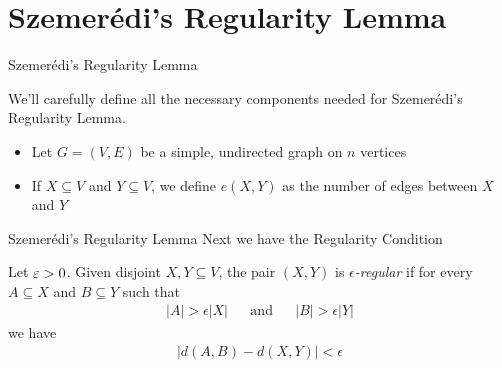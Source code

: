 \section{Szemer\'{e}di's Regularity Lemma}
\begin{frame}{Szemer\'{e}di's Regularity Lemma}
	
We'll carefully define all the necessary components needed for Szemer\'{e}di's Regularity Lemma.
\begin{itemize}
	\item<2-> Let $G = (V,E)$ be a simple, undirected graph on $n$ vertices
	\item<3-> If $X \subseteq V$ and $Y \subseteq V$, we define $e(X,Y)$ as the number of edges between $X$ and $Y$
\end{itemize}
	
\end{frame}

\begin{frame}{Szemer\'{e}di's Regularity Lemma}
Next we have the Regularity Condition
{
\begin{definition}
	Let $\varepsilon > 0$. Given disjoint $X, Y \subseteq V$, the pair $(X,Y)$ is {\em $\epsilon$-regular} if for every $A \subseteq X$ and $B \subseteq Y$ such that
	\begin{align*}
		|A| > \epsilon|X| & & \text{and} & & |B| > \epsilon|Y|
	\end{align*}
	we have
	\begin{align*}
		|d(A,B) - d(X,Y)| < \epsilon
	\end{align*}
\end{definition}}
\end{frame}

